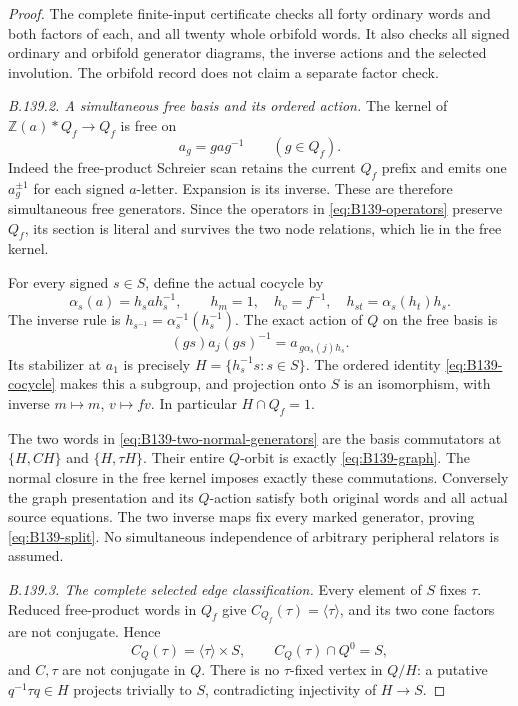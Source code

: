 \begin{proof}
The complete finite-input certificate checks all forty ordinary
words and both factors of each, and all twenty whole orbifold
words. It also checks all signed ordinary and orbifold generator
diagrams, the inverse actions and the selected involution.
The orbifold record does not claim a separate factor check.

\emph{B.139.2. A simultaneous free basis and its ordered action.}
The kernel of $\mathbb Z(a)*Q_f\to Q_f$ is free on
\[
 a_g=gag^{-1}\qquad(g\in Q_f).
\]
Indeed the free-product Schreier scan retains the current $Q_f$
prefix and emits one $a_g^{\pm1}$ for each signed $a$-letter.
Expansion is its inverse. These are therefore simultaneous
free generators. Since the operators in \eqref{eq:B139-operators}
preserve $Q_f$, its section is literal and survives the two
node relations, which lie in the free kernel.

For every signed $s\in S$, define the actual cocycle by
\begin{equation}\label{eq:B139-cocycle}
 \alpha_s(a)=h_sah_s^{-1},\qquad
 h_m=1,\quad h_v=f^{-1},\quad
 h_{st}=\alpha_s(h_t)h_s .
\end{equation}
The inverse rule is
$h_{s^{-1}}=\alpha_s^{-1}(h_s^{-1})$.
The exact action of $Q$ on the free basis is
\[
 (gs)a_j(gs)^{-1}=a_{\,g\alpha_s(j)h_s}.
\]
Its stabilizer at $a_1$ is precisely
$H=\{h_s^{-1}s:s\in S\}$.
The ordered identity \eqref{eq:B139-cocycle} makes this a subgroup,
and projection onto $S$ is an isomorphism, with inverse
$m\mapsto m$, $v\mapsto fv$.
In particular $H\cap Q_f=1$.

The two words in \eqref{eq:B139-two-normal-generators} are
the basis commutators at $\{H,CH\}$ and $\{H,\tau H\}$.
Their entire $Q$-orbit is exactly \eqref{eq:B139-graph}.
The normal closure in the free kernel imposes exactly these
commutations. Conversely the graph presentation and its $Q$-action
satisfy both original words and all actual source equations.
The two inverse maps fix every marked generator, proving
\eqref{eq:B139-split}. No simultaneous independence of arbitrary
peripheral relators is assumed.

\emph{B.139.3. The complete selected edge classification.}
Every element of $S$ fixes $\tau$. Reduced free-product words in
$Q_f$ give $C_{Q_f}(\tau)=\langle\tau\rangle$, and its two cone
factors are not conjugate. Hence
\[
 C_Q(\tau)=\langle\tau\rangle\times S,\qquad
 C_Q(\tau)\cap Q^0=S,
\]
and $C,\tau$ are not conjugate in $Q$.
There is no $\tau$-fixed vertex in $Q/H$: a putative
$q^{-1}\tau q\in H$ projects trivially to $S$, contradicting
injectivity of $H\to S$.


\end{proof}
